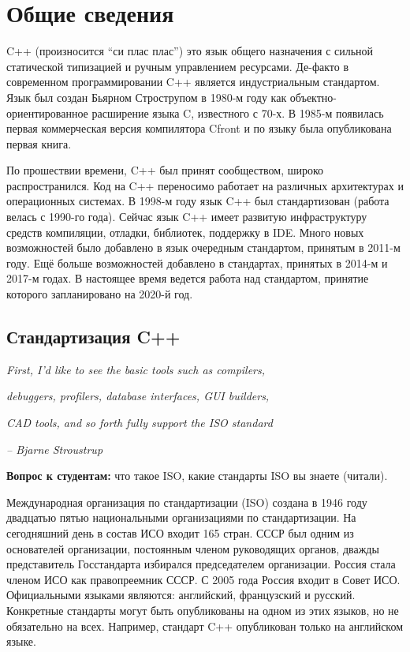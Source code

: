 \documentclass[a4paper,12pt,oneside]{book}
\begin{document}
\pagebreak
\chapter{Общие сведения}\label{StdIntroduction}

C++ (произносится ``си плас плас'') это язык общего назначения с сильной статической типизацией и ручным управлением ресурсами. Де-факто в современном программировании C++ является индустриальным стандартом. Язык был создан Бьярном Строструпом в 1980-м году как объектно-ориентированное расширение языка C, известного с 70-х. В 1985-м появилась первая коммерческая версия компилятора Cfront и по языку была опубликована первая книга. 

По прошествии времени, C++ был принят сообществом, широко распространился. Код на C++ переносимо работает на различных архитектурах и операционных системах. В 1998-м году язык C++ был стандартизован (работа велась с 1990-го года). Сейчас язык C++ имеет развитую инфраструктуру средств компиляции, отладки, библиотек, поддержку в IDE. Много новых возможностей было добавлено в язык очередным стандартом, принятым в 2011-м году. Ещё больше возможностей добавлено в стандартах, принятых в 2014-м и 2017-м годах. В настоящее время ведется работа над стандартом, принятие которого запланировано на 2020-й год.

\section{Стандартизация C++}\label{Standartization}

\hfill\textit{First, I'd like to see the basic tools such as compilers,}

\hfill\textit{debuggers, profilers, database interfaces, GUI builders,} 

\hfill\textit{CAD tools, and so forth fully support the ISO standard}{\vspace{0.5em}}

\hfill\textit{-- Bjarne Stroustrup}

\textbf{Вопрос к студентам:} что такое ISO, какие стандарты ISO вы знаете (читали).

Международная организация по стандартизации (ISO) создана в 1946 году двадцатью пятью национальными организациями по стандартизации. На сегодняшний день в состав ИСО входит 165 стран. СССР был одним из основателей организации, постоянным членом руководящих органов, дважды представитель Госстандарта избирался председателем организации. Россия стала членом ИСО как правопреемник СССР. С 2005 года Россия входит в Совет ИСО. Официальными языками являются: английский, французский и русский. Конкретные стандарты могут быть опубликованы на одном из этих языков, но не обязательно на всех. Например, стандарт C++ опубликован только на английском языке.
\end{document}
